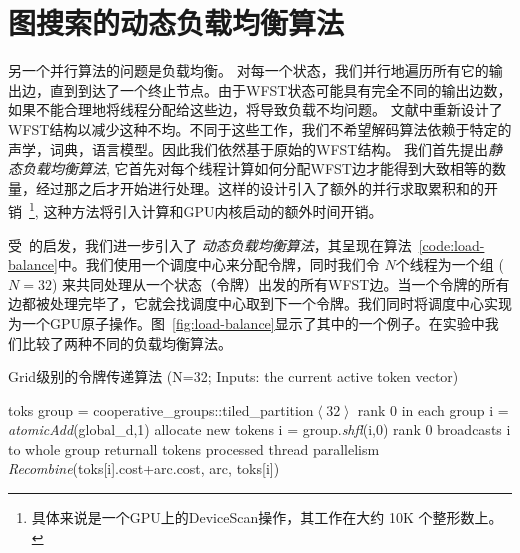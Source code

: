 \section{图搜索的动态负载均衡算法}
\label{sec:para-viterbi}

另一个并行算法的问题是负载均衡。
对每一个状态，我们并行地遍历所有它的输出边，直到到达了一个终止节点。由于WFST状态可能具有完全不同的输出边数，如果不能合理地将线程分配给这些边，将导致负载不均问题。
文献\cite{you2009parallel,mendis2016parallelizing}中重新设计了 WFST结构以减少这种不均。不同于这些工作，我们不希望解码算法依赖于特定的声学，词典，语言模型。因此我们依然基于原始的WFST结构。
我们首先提出\textit{静态负载均衡算法}, 它首先对每个线程计算如何分配WFST边才能得到大致相等的数量，经过那之后才开始进行处理。这样的设计引入了额外的并行求取累积和的开销~\footnote{具体来说是一个GPU上的DeviceScan操作，其工作在大约 10K 个整形数上。},
这种方法将引入计算和GPU内核启动的额外时间开销。

受~\cite{alakeel2010}的启发，我们进一步引入了
\textit{动态负载均衡算法}，其呈现在算法~\ref{code:load-balance}中。我们使用一个调度中心来分配令牌，同时我们令 $N$个线程为一个组 ($N = 32$) 来共同处理从一个状态（令牌）出发的所有WFST边。当一个令牌的所有边都被处理完毕了，它就会找调度中心取到下一个令牌。我们同时将调度中心实现为一个GPU原子操作。图~\ref{fig:load-balance}显示了其中的一个例子。在实验中我们比较了两种不同的负载均衡算法。


\vspace{-0.5em}
\begin{algorithm}[ht]
\caption{Grid级别的令牌传递算法 \textcolor[rgb]{0,0.5,0}{(N=32; Inputs: the current active token vector)}}
\label{code:load-balance}
\begin{algorithmic}[1]
 {toks}
\State group = cooperative\_groups::tiled\_partition$\left<32\right>$
\Comment\textcolor[rgb]{0,0.5,0}{rank 0 in each group}
\State i = \textit{atomicAdd}(global\_d,1)  \Comment\textcolor[rgb]{0,0.5,0}{allocate new tokens}
\EndIf      %
\State i = group.\textit{shfl}(i,0) \Comment \textcolor[rgb]{0,0.5,0}{rank 0 broadcasts i to whole group}
 return\Comment \textcolor[rgb]{0,0.5,0}{all tokens processed}
\EndIf 
{} \Comment \textcolor[rgb]{0,0.5,0}{thread parallelism}
 \textit{Recombine}(toks[i].cost+arc.cost, arc, toks[i])
\EndFor
\EndProcedure
\end{algorithmic}
\end{algorithm}


